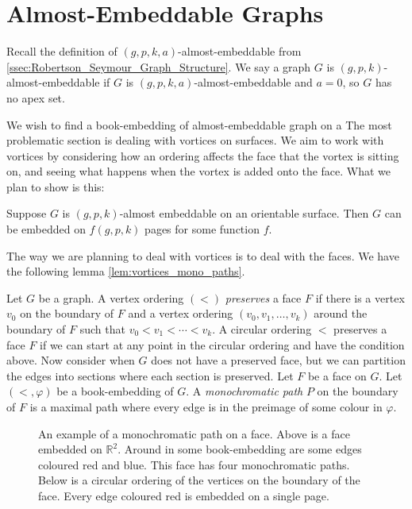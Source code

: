 \section{Almost-Embeddable Graphs}
Recall the definition of $(g, p, k, a)$-almost-embeddable from \cref{ssec:Robertson_Seymour_Graph_Structure}. We say a graph $G$ is $(g, p, k)$-almost-embeddable if $G$ is $(g, p, k, a)$-almost-embeddable and $a = 0$, so $G$ has no apex set.

We wish to find a book-embedding of almost-embeddable graph on a 
The most problematic section is dealing with vortices on surfaces.
We aim to work with vortices by considering how an ordering affects the face that the vortex is sitting on, and seeing what happens when the vortex is added onto the face.
What we plan to show is this:
\begin{theorem}\label{thm:bounded_almost_embeddable}
	Suppose $G$ is $(g, p, k)$-almost embeddable on an orientable surface. Then $G$ can be embedded on \(f(g, p, k)\) pages for some function $f$.
\end{theorem}
The way we are planning to deal with vortices is to deal with the faces. We have the following lemma \cref{lem:vortices_mono_paths}. 

Let \(G\) be a graph. A vertex ordering \((<)\) \textit{preserves} a face \(F\) if there is a vertex \(v_0\) on the boundary of \(F\) and a vertex ordering \((v_0, v_1, \ldots, v_k)\) around the boundary of \(F\) such that \(v_0 < v_1 < \cdots < v_k\).
A circular ordering \(<\) preserves a face \(F\) if we can start at any point in the circular ordering and have the condition above.
Now consider when \(G\) does not have a preserved face, but we can partition the edges into sections where each section is preserved. Let \(F\) be a face on \(G\). Let \( (<, \varphi) \) be a book-embedding of \(G\). A \textit{monochromatic path} $P$ on the boundary of $F$ is a maximal path where every edge is in the preimage of some colour in $\varphi$.

\begin{figure}[h!]
	
	\caption[Monochromatic paths]{An example of a monochromatic path on a face. Above is a face embedded on $\mathbb{R}^2$. Around in some book-embedding are some edges coloured red and blue. This face has four monochromatic paths. Below is a circular ordering of the vertices on the boundary of the face. Every edge coloured red is embedded on a single page.}
\end{figure}


